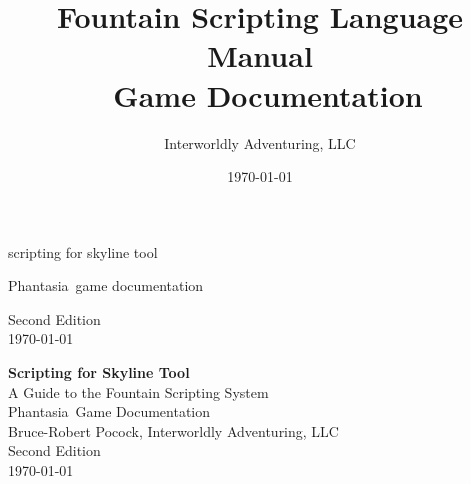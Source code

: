 \documentclass[11pt,letterpaper,oldstylefigures]{memoir}
\title{\Huge\textbf{Fountain Scripting Language Manual}\\\vspace{0.5em}\large \Phantasia\ Game Documentation}
\author{Interworldly Adventuring, LLC}
\date{\today}
\newcommand{\Phantasia}{{\irishfont Phantasia}}
\begin{document}
\frontmatter
\pagestyle{empty}

\thispagestyle{empty}
\vspace*{0.5in}
\begin{center}
    {\irishfont\fontsize{48}{60}\selectfont\color{chaptercolor} scripting for skyline tool\par}
    \vspace{3em}
    \vspace{2em}
    \begin{center}
    \end{center}
    \vspace{8em}
    {\irishfont\Large\color{sectioncolor} \Phantasia\ game documentation\par}
\end{center}
\vfill
\begin{flushright}
  {\ttfamily Second Edition\\
  \today}
\end{flushright}
\newpage

\thispagestyle{empty}
\vspace*{2in}
\begin{center}
{\ttfamily\fontsize{10}{12}\selectfont
\textbf{Scripting for Skyline Tool}\\
\vspace{1em}
A Guide to the Fountain Scripting System\\
\vspace{2em}
\Phantasia\ Game Documentation\\
\vspace{3em}
Bruce-Robert Pocock, Interworldly Adventuring, LLC\\
Second Edition\\
\today
}
\end{center}
\newpage
\end{document}
